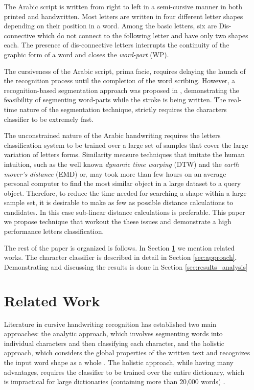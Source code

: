 \documentclass[10pt, conference, compsocconf]{IEEEtran}
\begin{document}
The Arabic script is written from right to left in a semi-cursive manner in both printed and handwritten. 
Most letters are written in four different letter shapes depending on their position in a word.
Among the basic letters, six are Dis-connective which do not connect to the following letter and have only two shapes each. 
The presence of dis-connective letters interrupts the continuity of the graphic form of a word and closes the \emph{word-part} (WP).

The cursiveness of the Arabic script, prima facie, requires delaying the launch of the recognition process until the completion of the word scribing.
However, a recognition-based segmentation approach was proposed in \cite{kour2014real}, demonstrating the feasibility of segmenting word-parts while the stroke is being written.
The real-time nature of the segmentation technique, strictly requires the characters classifier to be extremely fast.

The unconstrained nature of the Arabic handwriting requires the letters classification system to be trained over a large set of samples that cover the large variation of letters forms.
Similarity measure techniques that imitate the human intuition, such as the well known \emph{dynamic time warping} (DTW) and the \emph{earth mover's distance} (EMD) or, may took more than few hours on an average personal computer to find the most similar object in a large dataset to a query object.
Therefore, to reduce the time needed for searching a shape within a large sample set, it is desirable to make as few as possible distance calculations to candidates.
In this case sub-linear distance calculations is preferable.
This paper we propose technique that workout the these issues and demonstrate a high performance letters classification. 

The rest of the paper is organized is follows. 
In Section \ref{sec:related_work} we mention related works. 
The character classifier is described in detail in Section \ref{sec:approach}. 
Demonstrating and discussing the results is done in Section \ref{sec:results_analysis}

\section{Related Work}
\label{sec:related_work}

Literature in cursive handwriting recognition has established two main approaches: the analytic approach, which involves segmenting words into individual characters and then classifying each character\cite{abdulla2008off, sari2002off, Dinges2011}, and the holistic approach, which considers the global properties of the written text and recognizes the input word shape as a whole \cite{biadsy2011segmentation, saabni2009hierarchical}. 
The holistic approach, while having many advantages, requires the classifier to be trained over the entire dictionary, which is impractical for large dictionaries (containing more than 20,000 words) \cite{elanwar2012unconstrained}.
\end{document}
